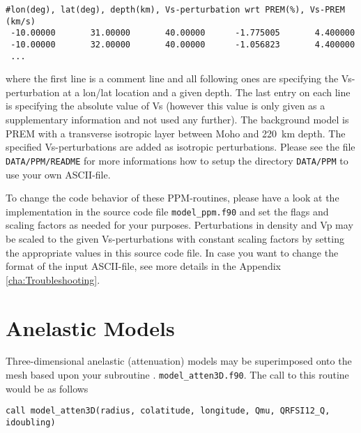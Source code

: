 {\footnotesize
\begin{verbatim}
#lon(deg), lat(deg), depth(km), Vs-perturbation wrt PREM(%), Vs-PREM (km/s)
 -10.00000       31.00000       40.00000      -1.775005       4.400000
 -10.00000       32.00000       40.00000      -1.056823       4.400000
 ...
\end{verbatim}
}
\noindent
where the first line is a comment line and all following ones are specifying the Vs-perturbation at a lon/lat location and a given depth.
The last entry on each line is specifying the absolute value of Vs (however this value is only given as a supplementary information
and not used any further). The background model is PREM with a transverse isotropic layer between Moho and 220~km depth.
The specified Vs-perturbations are added as isotropic perturbations. Please see the file \texttt{DATA/PPM/README}
for more informations how to setup the directory \texttt{DATA/PPM} to use your own ASCII-file.\newline



To change the code behavior of these PPM-routines, please have a look at the implementation in the source code
file \texttt{model\_ppm.f90} and set the flags and scaling factors as needed for your purposes.
Perturbations in density and Vp may be scaled to the given Vs-perturbations with constant scaling factors by setting the appropriate
values in this source code file. In case you want to change the format of the input ASCII-file, see more details in the Appendix \ref{cha:Troubleshooting}.




\section{Anelastic Models}\label{sec:Anelastic-Models}

Three-dimensional anelastic (attenuation) models may be superimposed
onto the mesh based upon your subroutine .
\texttt{model\_atten3D.f90}.
The call to this routine would be as follows
\begin{verbatim}
call model_atten3D(radius, colatitude, longitude, Qmu, QRFSI12_Q, idoubling)
\end{verbatim}

